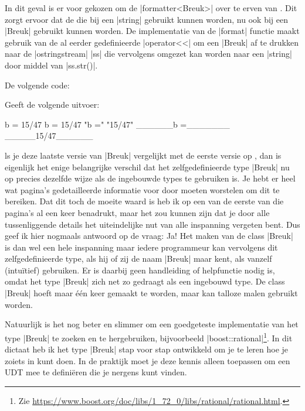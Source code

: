 \begin{cpplstShortInline}

In dit geval is er voor gekozen om de |formatter<Breuk>| over te erven van .
Dit zorgt ervoor dat de  die bij een |string| gebruikt kunnen worden, nu ook bij een |Breuk| gebruikt kunnen worden.
De implementatie van de |format| functie maakt gebruik van de al eerder gedefinieerde |operator<<| om een |Breuk| af te drukken naar de |ostringstream| |ss| die vervolgens omgezet kan worden naar een |string| door middel van |ss.str()|.

De volgende code:

Geeft de volgende uitvoer:
\begin{coutput}
b = 15/47
     b =
   15/47
"b ="
"15/47"
______b =_______
_____15/47______
\end{coutput}

ls je deze laatste versie van |Breuk| vergelijkt met de eerste versie op , dan is eigenlijk het enige belangrijke verschil dat het zelfgedefinieerde type |Breuk| nu op precies dezelfde wijze als de ingebouwde types te gebruiken is. 
Je hebt er heel wat pagina's gedetailleerde informatie voor door moeten worstelen om dit te bereiken. 
Dat dit toch de moeite waard is heb ik op een van de eerste van die pagina's al een keer benadrukt, maar het zou kunnen zijn dat je door alle tussenliggende details het uiteindelijke nut van alle inspanning vergeten bent. 
Dus geef ik hier nogmaals antwoord op de vraag:  
Ja! 
Het maken van de class |Breuk| is dan wel een hele inspanning maar iedere programmeur kan vervolgens dit zelfgedefinieerde type, als hij of  zij de naam |Breuk| maar kent, als vanzelf (intuïtief) gebruiken. 
Er is daarbij geen handleiding of helpfunctie nodig is, omdat het type |Breuk| zich net zo gedraagt als een ingebouwd type. 
De class |Breuk| hoeft maar één keer gemaakt te worden, maar kan talloze malen gebruikt worden.

Natuurlijk is het nog beter en slimmer om een goedgeteste implementatie van het type |Breuk| te zoeken en te hergebruiken, bijvoorbeeld |boost::rational|\footnote{%
	Zie \url{https://www.boost.org/doc/libs/1_72_0/libs/rational/rational.html}.
}.
In dit dictaat heb ik het type |Breuk| stap voor stap ontwikkeld om je te leren hoe je zoiets in \Cpp{} kunt doen.
In de praktijk moet je deze kennis alleen toepassen om een UDT mee te definiëren die je nergens kunt vinden.


\end{cpplstShortInline}
